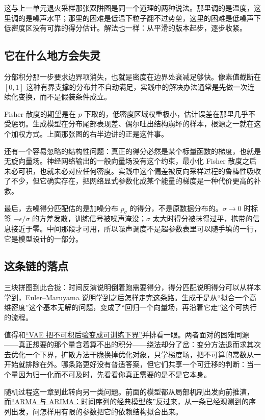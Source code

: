 这与上一单元退火采样那张双阱图是同一个道理的两种说法。那里调的是温度，这里调的是噪声水平；那里的困难是低温下粒子翻不过势垒，这里的困难是低噪声下低密度区没有可靠的得分估计。解法也一样：从平滑的版本起步，逐步收紧。

\subsection{它在什么地方会失灵}

分部积分那一步要求边界项消失，也就是密度在边界处衰减足够快。像素值截断在 \([0,1]\) 这种有界支撑的分布并不自动满足，实践中的解决办法通常是先做一次连续化变换，而不是假装条件成立。

Fisher 散度的期望是在 \(p\) 下取的，低密度区域权重极小，估计误差在那里几乎不受惩罚。生成模型在分布尾部表现差、偶尔吐出结构崩坏的样本，根源之一就在这个加权方式。上面那张图的右半边讲的正是这件事。

还有一个容易忽略的结构性问题：真正的得分必然是某个标量函数的梯度，也就是无旋向量场。神经网络输出的一般向量场没有这个约束，最小化 Fisher 散度之后未必可积，也就未必对应任何密度。实践中这个偏差被反向采样过程的鲁棒性吸收了不少，但它确实存在，把网络显式参数化成某个能量的梯度是一种代价更高的补救。

最后，去噪得分匹配估的是加噪分布 \(p_\sigma\) 的得分，不是原数据分布的。\(\sigma\to0\) 时标签 \(-\epsilon/\sigma\) 的方差发散，训练信号被噪声淹没；\(\sigma\) 太大时得分被抹得过平，携带的信息接近于零。中间那段才可用，所以噪声调度不是超参数表里可以随手填的一行，它是模型设计的一部分。

\subsection{这条链的落点}

三块拼图到此合拢：时间反演说明倒着跑需要得分，得分匹配说明得分可以从样本学到，Euler--Maruyama 说明学到之后怎样走完这条路。生成于是从``拟合一个高维密度''这个基本无解的问题，变成了``回归一个向量场，再沿着它走''这个可执行的流程。

值得和\hyperref[sec:14-Deep-Learning/06-Variational-Autoencoders/01]{``VAE 把不可积后验变成可训练下界''}并排看一眼。两者面对的困难同源——真正想要的那个量含着算不出的积分——绕法却分了岔：变分方法退而求其次去优化一个下界，扩散方法干脆换掉优化对象，只学梯度场，把不可算的常数从一开始就排除在外。哪条路更好没有普适答案，但它们共享一个可迁移的判断：当一个量因为归一化而不可及时，先看看你真正需要的是不是它本身。

随机过程这一章到此转向另一类问题。前面的模型都从局部机制出发向前推演，而\hyperref[ch:052]{``ARMA 与 ARIMA：时间序列的经典模型族''}反过来，从一条已经观测到的序列出发，问怎样用有限的参数把它的依赖结构拟合出来。
